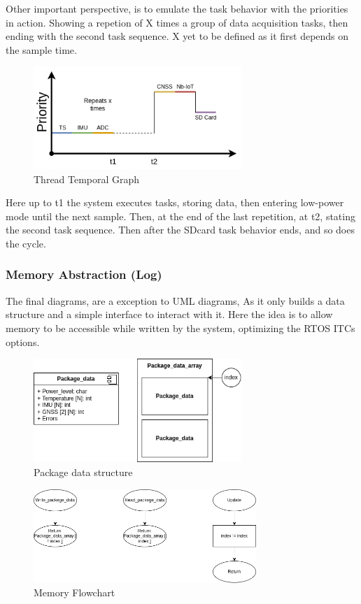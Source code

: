 Other important perspective, is to emulate the task behavior with the priorities in action. 
Showing a repetion of X times a group of data acquisition tasks, then ending with the second task sequence.
X yet to be defined as it first depends on the sample time. 
\begin{figure}[H]
    \centering
    \includegraphics[width=0.7\textwidth]{images/diagrams/threads/graph/threads_graph.drawio.png}  %
    \caption{Thread Temporal Graph}
    \label{fig:Thread Temporal Graph}        
\end{figure}

Here up to t1 the system executes tasks, storing data, then entering low-power mode until the next sample.
Then, at the end of the last repetition, at t2, stating the second task sequence. Then after the SDcard task behavior ends, and so does the cycle.
\subsubsection{Memory Abstraction (Log)} 

The final diagrams, are a exception to UML diagrams, As it only builds a data structure and a simple interface to interact with it.
Here the idea is to allow memory to be accessible while written by the system, optimizing the RTOS ITCs options.
\begin{figure}[H]
    \centering
    \includegraphics[width=0.7\textwidth]{images/diagrams/data_struct/package_data.drawio.png}  %
    \caption{Package data structure}
    \label{fig:Package data structure}        
\end{figure}


\begin{figure}[H]
    \centering
    \includegraphics[width=0.75\textwidth]{images/diagrams/data_struct/fluxogram.png}  %
    \caption{Memory Flowchart}
    \label{fig:Memory Flowchart}        
\end{figure}
